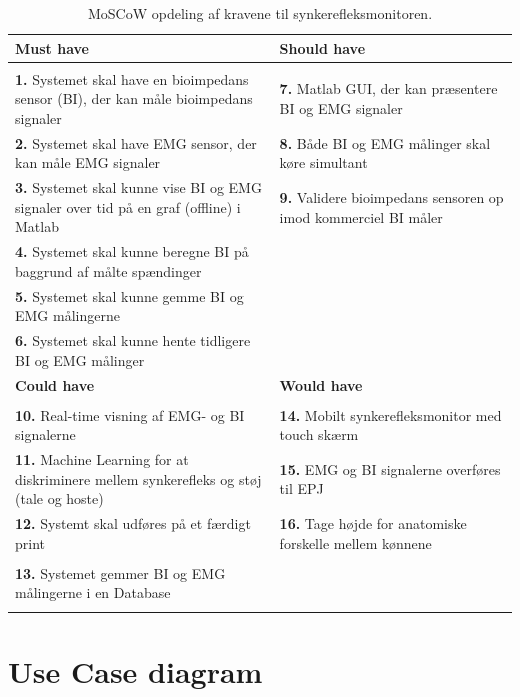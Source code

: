 \begin{table}[H]

\begin{tabularx}{\textwidth}{X|X}
\rowcolor{Gray}
\toprule
\textbf{Must have} & \textbf{Should have} \\
\hline \\
\textbf{1. }Systemet skal have en bioimpedans sensor (BI), der kan måle bioimpedans signaler & \textbf{7. }Matlab GUI, der kan præsentere BI og EMG signaler \\[4ex]
\textbf{2. }Systemet skal have EMG sensor, der kan måle EMG signaler & \textbf{8. }Både BI og EMG målinger skal køre simultant\\[4ex]
\textbf{3. }Systemet skal kunne vise BI og EMG signaler over tid på en graf (offline) i Matlab  & \textbf{9. }Validere bioimpedans sensoren op imod kommerciel BI måler \\[4ex]
\textbf{4. }Systemet skal kunne beregne BI på baggrund af målte spændinger & \\[4ex]
\textbf{5. }Systemet skal kunne gemme BI og EMG målingerne & \\[4ex]
\textbf{6. }Systemet skal kunne hente tidligere BI og EMG målinger & \\[4ex]


\midrule
    \rowcolor{Gray}
    \textbf{Could have} & \textbf{Would have}\\
    \midrule \\
    \textbf{10. }Real-time visning af EMG- og BI signalerne & \textbf{14. }Mobilt synkerefleksmonitor med touch skærm\\[4ex]
\textbf{11. }Machine Learning for at diskriminere mellem synkerefleks og støj (tale og hoste) & \textbf{15. }EMG og BI signalerne overføres til EPJ  \\[4ex]
\textbf{12. }Systemt skal udføres på et færdigt print& \textbf{16. }Tage højde for anatomiske forskelle mellem kønnene\\[4ex]
& \\
\textbf{13. }Systemet gemmer BI og EMG målingerne i en Database& \\[4ex]
& \\

\end{tabularx}

\caption{MoSCoW opdeling af kravene til  synkerefleksmonitoren.}
  \label{tab:moscow}
\end{table}

\pagebreak
\section{Use Case diagram}


